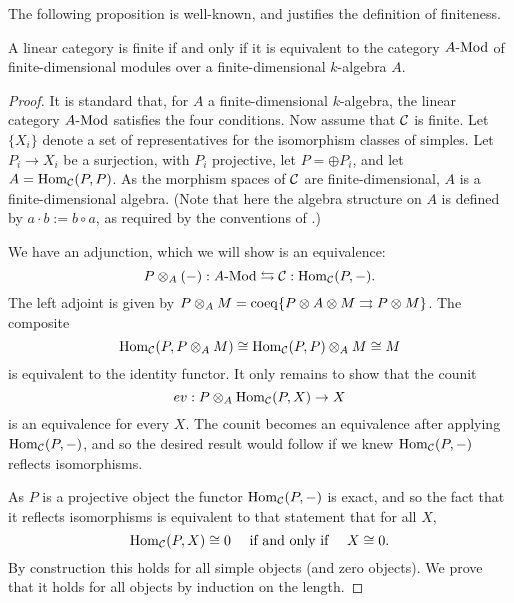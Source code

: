 \documentclass{amsart}
\begin{document}
The following proposition is well-known, and justifies the definition of finiteness.

\begin{proposition}
A linear category is finite if and only if it is equivalent to the category $\Mod{A}{}$ of finite-dimensional modules over a finite-dimensional $k$-algebra $A$.
\end{proposition}
\begin{proof}
	It is standard that, for $A$ a finite-dimensional $k$-algebra, the linear category $\Mod{A}{}$ satisfies the four conditions. 
	Now assume that $\mathcal C$ is finite. Let $\{X_i\}$ denote a set of representatives for the isomorphism classes of simples. Let $P_i \to X_i$ be a surjection, with $P_i$ projective, let $P = \oplus P_i$, and let $A = \operatorname{Hom}_{\mathcal C}(P,P)$. As the morphism spaces of $\mathcal C$ are finite-dimensional, $A$ is a finite-dimensional algebra.  (Note that here the algebra structure on $A$ is defined by $a \cdot b := b \circ a$, as required by the conventions of \cite{DTCI}.)
	
We have an adjunction, which we will show is an equivalence:
	\begin{equation*}
		P \otimes_A (-):\Mod{A}{} \leftrightarrows \cC: \Hom_{\cC}(P,-).
	\end{equation*}
	The left adjoint is given by $P \otimes_A M = \operatorname{coeq}\{ P \otimes A \otimes M \rightrightarrows P \otimes M\}$. 
The composite 
\begin{equation*}
	\operatorname{Hom}_{\mathcal C}(P, P \otimes_A M) \cong \operatorname{Hom}_{\mathcal C}(P, P) \otimes_A M \cong M
\end{equation*}
 is equivalent to the identity functor. It only remains to show that the counit 
\begin{equation*}
	ev:P \otimes_A \operatorname{Hom}_{\mathcal C}(P, X) \to X
\end{equation*}
is an equivalence for every $X$. The counit becomes an equivalence after applying $\operatorname{Hom}_{\mathcal C}(P,-)$, and so the desired result would follow if we knew $\operatorname{Hom}_{\mathcal C}(P,-)$ reflects isomorphisms. 

As $P$ is a projective object the functor $\operatorname{Hom}_{\mathcal C}(P,-)$ is exact, and so the fact that it reflects isomorphisms is equivalent to that statement that for all $X$, 
\begin{equation*}
	\operatorname{Hom}_{\mathcal C}(P,X) \cong 0 \quad \textrm{ if and only if } \quad X \cong 0.
\end{equation*} 
By construction this holds for all simple objects (and zero objects). We prove that it holds for all objects by induction on the length. 


\end{proof}
\end{document}
